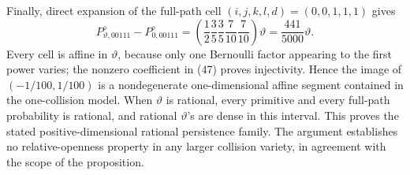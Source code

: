 Finally, direct expansion of the full-path cell \((i,j,k,l,d)=(0,0,1,1,1)\) gives
\[
 P^{\diamond}_{\vartheta,00111}-P^{\diamond}_{0,00111}
 =\left(\frac12\frac35\frac35\frac7{10}\frac7{10}\right)\vartheta
 =\frac{441}{5000}\vartheta.
 \tag{47}
\]
Every cell is affine in \(\vartheta\), because only one Bernoulli factor appearing to the first power varies; the nonzero coefficient in (47) proves injectivity.  Hence the image of \((-1/100,1/100)\) is a nondegenerate one-dimensional affine segment contained in the one-collision model.  When \(\vartheta\) is rational, every primitive and every full-path probability is rational, and rational \(\vartheta\)'s are dense in this interval.  This proves the stated positive-dimensional rational persistence family.  The argument establishes no relative-openness property in any larger collision variety, in agreement with the scope of the proposition.
